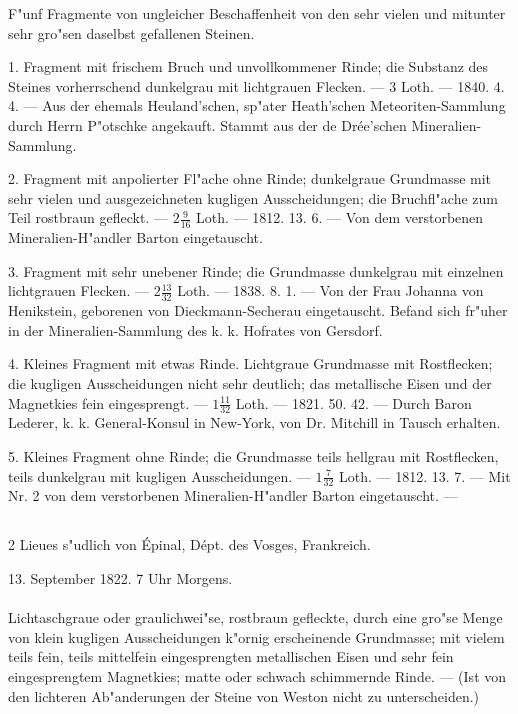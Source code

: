 \documentclass[a4paper, 11pt, oneside, polutonikogreek, german]{article}
\begin{document}
F"unf Fragmente von ungleicher Beschaffenheit von den sehr vielen und mitunter sehr gro"sen daselbst gefallenen Steinen.

1. Fragment mit frischem Bruch und unvollkommener Rinde; die Substanz des Steines vorherrschend dunkelgrau mit lichtgrauen Flecken. --- 3 Loth. --- 1840. 4. 4. --- Aus der ehemals Heuland'schen, sp"ater Heath'schen Meteoriten-Sammlung durch Herrn P"otschke angekauft. Stammt aus der de Drée'schen Mineralien-Sammlung.

2. Fragment mit anpolierter Fl"ache ohne Rinde; dunkelgraue Grundmasse mit sehr vielen und ausgezeichneten kugligen Ausscheidungen; die Bruchfl"ache zum Teil rostbraun gefleckt. --- $\mathfrak{2\frac{9}{16}}$ Loth. --- 1812. 13. 6. --- Von dem verstorbenen Mineralien-H"andler Barton eingetauscht.

3. Fragment mit sehr unebener Rinde; die Grundmasse dunkelgrau mit einzelnen lichtgrauen Flecken. --- $\mathfrak{2\frac{13}{32}}$ Loth. --- 1838. 8. 1. --- Von der Frau Johanna von Henikstein, geborenen von Dieckmann-Secherau eingetauscht. Befand sich fr"uher in der Mineralien-Sammlung des k. k. Hofrates von Gersdorf.

4. Kleines Fragment mit etwas Rinde. Lichtgraue Grundmasse mit Rostflecken; die kugligen Ausscheidungen nicht sehr deutlich; das metallische Eisen und der Magnetkies fein eingesprengt. --- $\mathfrak{1\frac{11}{32}}$ Loth. --- 1821. 50. 42. --- Durch Baron Lederer, k. k. General-Konsul in New-York, von Dr. Mitchill in Tausch erhalten.

5. Kleines Fragment ohne Rinde; die Grundmasse teils hellgrau mit Rostflecken, teils dunkelgrau mit kugligen Ausscheidungen. --- $\mathfrak{1\frac{7}{32}}$ Loth. --- 1812. 13. 7. --- Mit Nr. 2 von dem verstorbenen Mineralien-H"andler Barton eingetauscht. ---
\subsection[\swabfamily {La Baffe.}]{}
\begin{center}

2 Lieues s"udlich von Épinal, Dépt. des Vosges, Frankreich.

13. September 1822. 7 Uhr Morgens.
\end{center}
\paragraph{}
Lichtaschgraue oder graulichwei"se, rostbraun gefleckte, durch eine gro"se Menge von klein kugligen Ausscheidungen k"ornig erscheinende Grundmasse; mit vielem teils fein, teils mittelfein eingesprengten metallischen Eisen und sehr fein eingesprengtem Magnetkies; matte oder schwach schimmernde Rinde. --- (Ist von den lichteren Ab"anderungen der Steine von Weston nicht zu unterscheiden.)
\end{document}

